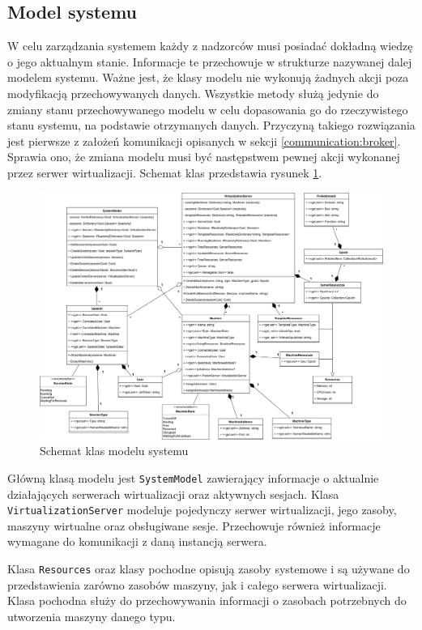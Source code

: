 \documentclass[../opis-rozwiazania.tex]{subfiles}
\begin{document}
\subsection{Model systemu}

W celu zarządzania systemem każdy z nadzorców musi posiadać dokładną wiedzę o jego aktualnym stanie. Informacje te przechowuje w strukturze nazywanej dalej modelem systemu. Ważne jest, że klasy modelu nie wykonują żadnych akcji poza modyfikacją przechowywanych danych. Wszystkie metody służą jedynie do zmiany stanu przechowywanego modelu w celu dopasowania go do rzeczywistego stanu systemu, na podstawie otrzymanych danych. Przyczyną takiego rozwiązania jest pierwsze z założeń komunikacji opisanych w sekcji \ref{communication:broker}. Sprawia ono, że zmiana modelu musi być następstwem pewnej akcji wykonanej przez serwer wirtualizacji. Schemat klas przedstawia rysunek \ref{figure:architecture:model}.

\begin{figure}[ht]
  \centering
  \includegraphics[width=\textwidth]{../diagrams/class_diagrams/system_model_v2.png}
  \caption{Schemat klas modelu systemu}
  \label{figure:architecture:model}
\end{figure}

Główną klasą modelu jest \texttt{SystemModel} zawierający informacje o aktualnie działających serwerach wirtualizacji oraz aktywnych sesjach. Klasa \texttt{VirtualizationServer} modeluje pojedynczy serwer wirtualizacji, jego zasoby, maszyny wirtualne oraz obsługiwane sesje. Przechowuje również informacje wymagane do komunikacji z daną instancją serwera.

Klasa \texttt{Resources} oraz klasy pochodne opisują zasoby systemowe i są używane do przedstawienia zarówno zasobów maszyny, jak i całego serwera wirtualizacji. Klasa pochodna \texttt{} służy do przechowywania informacji o zasobach potrzebnych do utworzenia maszyny danego typu.
\end{document}
